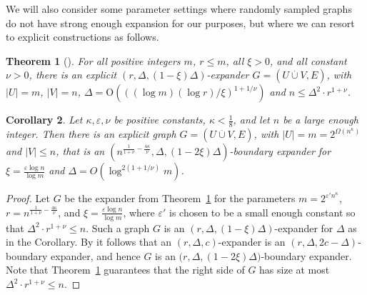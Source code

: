\documentclass{article}
\newtheorem{theorem}{Theorem}\newtheorem{lemma}[theorem]{Lemma}\newtheorem{proposition}[theorem]{Proposition}\newtheorem{corollary}[theorem]{Corollary}\newtheorem{definition}[theorem]{Definition}\newtheorem{claim}[theorem]{Claim}\newtheorem{remark}[theorem]{Remark}
\newcommand{\BIGOH}[1]{\mathrm{O} \left( #1 \right)}
\newcommand{\bigomega}[1]{\Omega ( #1 )}
\newcommand{\setsize}[1]{\lvert#1\rvert}
\newcommand{\disjointunion}{\overset{.}{\cup}}
\newcommand{\numpigeons}{m}
\newcommand{\numholes}{n}
\newcommand{\diff}{\xi}
\newcommand{\GdegMax}{\Delta}
\newcommand{\gdegmax}{\GdegMax}
\numberwithin{equation}{section}
\begin{document}
We will also consider some parameter settings where randomly
sampled graphs do not have strong enough expansion for our purposes, 
but where we can resort to explicit constructions as follows.

\begin{theorem}[\cite{GUV09Unbalanced}]\label{thm:expander}
  For all positive integers $\numpigeons$, $r \le \numpigeons$, all $\diff > 0$,
  and all constant $\nu > 0$, there is an explicit 
  $( r, \gdegmax, (1- \diff)\GdegMax)$-expander
  $G=(U\disjointunion V, E)$,
  with $\setsize{U} = \numpigeons$,
  $\setsize{V} = \numholes$, 
  $\GdegMax = \BIGOH{ ((\log \numpigeons)(\log r) / \diff )^{1+1/\nu} }$
  and $\numholes \le \GdegMax^2 \cdot r^{1+\nu}$.
\end{theorem}


\begin{corollary}\label{cor:boundary_subexp}
  Let $\kappa, \varepsilon, \nu$ be positive constants,
  $\kappa <\frac{1}{8}$, and let $\numholes$ be a large enough
  integer.  Then there is an explicit graph
  $G=(U \disjointunion V, E)$, with
  $\setsize{U} = \numpigeons = 2^{\bigomega{\numholes^\kappa}}$ and
  $\setsize{V} \leq \numholes$, that is an
  $(\numholes^{\frac{1}{1 + \nu} - \frac{4\kappa}{\nu} }, \GdegMax, (1
  - 2\diff)\GdegMax)$-boundary expander for
  $\diff = \frac{ \varepsilon \log \numholes }{ \log \numpigeons }$
  and $\GdegMax = O(\log^{2 (1 + 1/\nu) }\numpigeons)$.
\end{corollary}

  \begin{proof}
    Let $G$ be the expander from Theorem~\ref{thm:expander} for the
    parameters
    $\numpigeons = 2^{\varepsilon' \numholes^\kappa}$, 
    $r = \numholes^{\frac{1}{1 + \nu} - \frac{4\kappa}{\nu} }$, and
    $\diff = \frac{ \varepsilon \log \numholes }{ \log \numpigeons }$,
    where $\varepsilon'$ is chosen to be a small enough constant so that 
    $\GdegMax^2 \cdot r^{1+\nu} \leq  \numholes$.
    Such a graph $G$ is an $(r, \gdegmax, (1-\diff)\GdegMax)$-expander
    for $\GdegMax$ as in the
    Corollary. By  it follows that an 
    $(r, \gdegmax, c)$-expander is an
    $(r, \gdegmax, 2c - \gdegmax)$-boundary expander, 
    and hence $G$ is an 
    $\bigl(r, \GdegMax, (1 -  2\diff)\GdegMax\bigr)$-boundary expander. Note
    that Theorem~\ref{thm:expander} guarantees that the right side of $G$ has size at most 
    $\GdegMax^2 \cdot r^{1+\nu} \leq \numholes$. 
  \end{proof}
\end{document}
